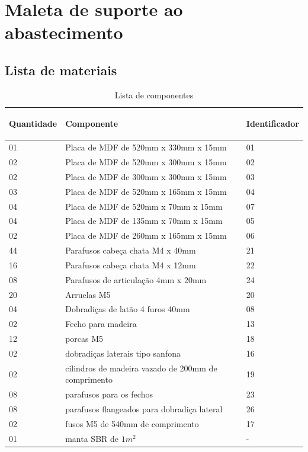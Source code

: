 \chapter{Maleta de suporte ao abastecimento}

\section{Lista de materiais}

\begin{table}[H]
\centering
\begin{tabular}{|m{2.0cm} |m{9.2cm}|m{2.0cm}|}
\hline
\begin{center}Quantidade\end{center} & \begin{center}Componente\end{center} &\begin{center} Identificador\end{center} \\\hline

    01 & Placa de MDF de 520mm x 330mm x 15mm & 01 \\\hline
    02 & Placa de MDF de 520mm x 300mm x 15mm & 02 \\\hline
    02 & Placa de MDF de 300mm x 300mm x 15mm & 03 \\\hline
    03 & Placa de MDF de 520mm x 165mm x 15mm & 04 \\\hline
    04 & Placa de MDF de 520mm x 70mm x 15mm & 07 \\\hline
    04 & Placa de MDF de 135mm x 70mm x 15mm & 05 \\\hline
    02 & Placa de MDF de 260mm x 165mm x 15mm & 06 \\\hline
    44 & Parafusos cabeça chata M4 x 40mm & 21 \\\hline
    16 & Parafusos cabeça chata M4 x 12mm & 22 \\\hline
    08 & Parafusos de articulação 4mm x 20mm & 24 \\\hline
    20 & Arruelas M5 & 20 \\\hline
    04 & Dobradiças de latão 4 furos 40mm & 08 \\\hline
    02 & Fecho para madeira & 13 \\\hline
    12 & porcas M5 & 18 \\\hline
    02 & dobradiças laterais tipo sanfona & 16 \\\hline
    02 & cilindros de madeira vazado de 200mm de comprimento & 19 \\\hline
    08 & parafusos para os fechos & 23 \\\hline
    08 & parafusos flangeados para dobradiça lateral & 26 \\\hline
    02 & fusos M5 de 540mm de comprimento & 17 \\\hline
    01 & manta SBR de $1 m^2$ & -  \\\hline

\end{tabular}
\label{table: tabelaComponentesMaletaIgnicao}
\caption{Lista de componentes}
\end{table}

